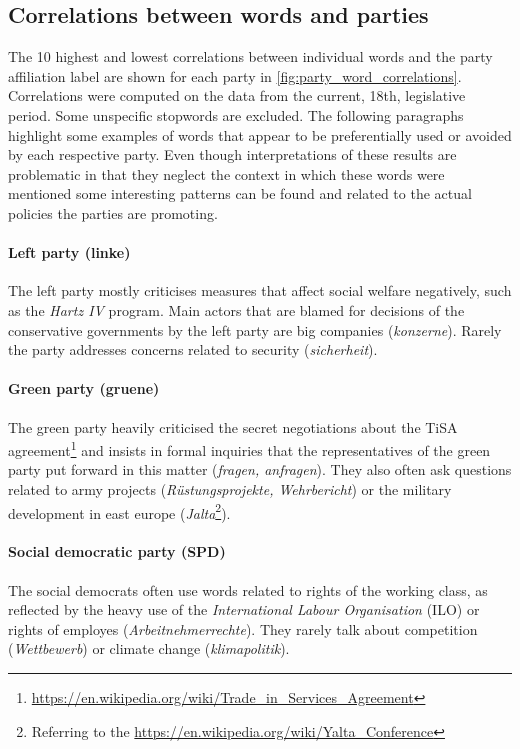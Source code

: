 \documentclass{article}
\begin{document}
\subsection{Correlations between words and parties}\label{sec:word_party_correlations}

The 10 highest and lowest correlations between individual words and the party affiliation label are shown for each party in \autoref{fig:party_word_correlations}. Correlations were computed on the data from the current, 18th, legislative period. Some unspecific stopwords are excluded. 
The following paragraphs highlight some examples of words that appear to be preferentially used or avoided by each respective party. Even though interpretations of these results are problematic in that they neglect the context in which these words were mentioned some interesting patterns can be found and related to the actual policies the parties are promoting. 
\paragraph{\bf Left party (linke)}
The left party mostly criticises measures that affect social welfare negatively, such as the {\em Hartz IV} program. Main actors that are blamed for decisions of the conservative governments by the left party are big companies ({\em konzerne}). Rarely the party addresses concerns related to security ({\em sicherheit}). 
\paragraph{\bf Green party (gruene)}
The green party heavily criticised the secret negotiations about the TiSA agreement\footnote{\url{https://en.wikipedia.org/wiki/Trade_in_Services_Agreement}} and insists in formal inquiries that the representatives of the green party put forward in this matter ({\em fragen, anfragen}). They also often ask questions related to army projects ({\em R\"ustungsprojekte, Wehrbericht}) or the military development in east europe ({\em  Jalta}\footnote{Referring to the \url{https://en.wikipedia.org/wiki/Yalta_Conference}}).
\paragraph{\bf Social democratic party (SPD)}
The social democrats often use words related to rights of the working class, as reflected by the heavy use of the {\em International Labour Organisation} (ILO) or rights of employes ({\em Arbeitnehmerrechte}). They rarely talk about competition ({\em Wettbewerb}) or climate change ({\em klimapolitik}). 
\end{document}
